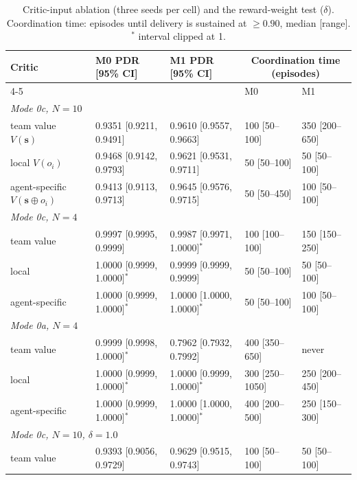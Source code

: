 \begin{table}[t]
\centering
\caption{Critic-input ablation (three seeds per cell) and the reward-weight test ($\delta$). Coordination time: episodes until delivery is sustained at $\geq 0.90$, median [range]. $^{*}$ interval clipped at 1.}
\label{tab:critic}
\footnotesize
\begin{tabular}{lllll}
\toprule
Critic & M0 PDR [95\% CI] & M1 PDR [95\% CI] & \multicolumn{2}{c}{Coordination time (episodes)} \\ \cmidrule(lr){4-5} & & & M0 & M1 \\
\midrule
\multicolumn{5}{l}{\textit{Mode 0c, $N = 10$}} \\
\quad team value $V(\mathbf{s})$ & 0.9351 [0.9211, 0.9491] & 0.9610 [0.9557, 0.9663] & 100 [50--100] & 350 [200--650] \\
\quad local $V(o_i)$ & 0.9468 [0.9142, 0.9793] & 0.9621 [0.9531, 0.9711] & 50 [50--100] & 50 [50--100] \\
\quad agent-specific $V(\mathbf{s}\oplus o_i)$ & 0.9413 [0.9113, 0.9713] & 0.9645 [0.9576, 0.9715] & 50 [50--450] & 100 [50--100] \\
\multicolumn{5}{l}{\textit{Mode 0c, $N = 4$}} \\
\quad team value & 0.9997 [0.9995, 0.9999] & 0.9987 [0.9971, 1.0000]$^{*}$ & 100 [100--100] & 150 [150--250] \\
\quad local & 1.0000 [0.9999, 1.0000]$^{*}$ & 0.9999 [0.9999, 0.9999] & 50 [50--100] & 50 [50--100] \\
\quad agent-specific & 1.0000 [0.9999, 1.0000]$^{*}$ & 1.0000 [1.0000, 1.0000]$^{*}$ & 50 [50--100] & 100 [50--100] \\
\multicolumn{5}{l}{\textit{Mode 0a, $N = 4$}} \\
\quad team value & 0.9999 [0.9998, 1.0000]$^{*}$ & 0.7962 [0.7932, 0.7992] & 400 [350--650] & never \\
\quad local & 1.0000 [0.9999, 1.0000]$^{*}$ & 1.0000 [0.9999, 1.0000]$^{*}$ & 300 [250--1050] & 250 [200--450] \\
\quad agent-specific & 1.0000 [0.9999, 1.0000]$^{*}$ & 1.0000 [1.0000, 1.0000]$^{*}$ & 400 [200--500] & 250 [150--300] \\
\multicolumn{5}{l}{\textit{Mode 0c, $N = 10$, $\delta = 1.0$}} \\
\quad team value & 0.9393 [0.9056, 0.9729] & 0.9629 [0.9515, 0.9743] & 100 [50--100] & 50 [50--100] \\
\bottomrule
\end{tabular}
\end{table}
